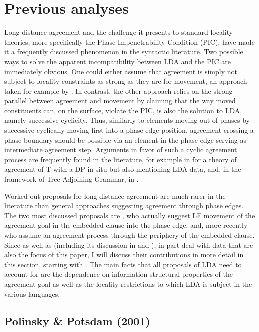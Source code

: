 \documentclass[output=paper
,modfonts
,nonflat]{langsci/langscibook}
\begin{document}
\section{Previous analyses}
\label{ch:3}

Long distance agreement and the challenge it presents to standard locality theories, more specifically the Phase Impenetrability Condition (PIC), have made it a frequently discussed phenomenon in the syntactic literature. Two possible ways to solve the apparent incompatibility between LDA and the PIC are immediately obvious. One could either assume that agreement is simply not subject to locality constraints as strong as they are for movement, an approach taken for example by \citet{Boskovic2007}. In contrast, the other approach relies on the strong parallel between agreement and movement by claiming that the way moved constituents can, on the surface, violate the PIC, is also the solution to LDA, namely successive cyclicity. Thus, similarly to elements moving out of phases by successive cyclically moving first into a phase edge position, agreement crossing a phase boundary should be possible via an element in the phase edge serving as intermediate agreement step. Arguments in favor of such a cyclic agreement process are frequently found in the literature, for example in \citet{Legate2005} for a theory of agreement of T with a DP in-situ but also mentioning LDA data, and, in the framework of Tree Adjoining Grammar, in \citet{Frank2006}. 

Worked-out proposals for long distance agreement are much rarer in the literature than general approaches suggesting agreement through phase edges. The two most discussed proposals are \citet{Polinsky_Potsdam2001}, who actually suggest LF movement of the agreement goal in the embedded clause into the phase edge, and, more recently \citet{Bjorkman_Zeijlstra2014} who assume an agreement process through the periphery of the embedded clause. Since \citet{Polinsky_Potsdam2001} as well as \citet{Bjorkman_Zeijlstra2014} (including its discussion in \citealt{Preminger2013} and \citealt{Preminger_Polinsky2015}), in part deal with data that are also the focus of this paper, I will discuss their contributions in more detail in this section, starting with \citet{Polinsky_Potsdam2001}. The main facts that all proposals of LDA need to account for are the dependence on information-structural properties of the agreement goal as well as the locality restrictions to which LDA is subject in the various languages.

\subsection{Polinsky \& Potsdam (2001)}
\end{document}
